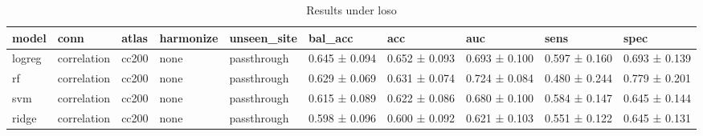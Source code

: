 \begin{table}
\caption{Results under loso}
\label{tab:loso}
\begin{tabular}{llllllllll}
\toprule
model & conn & atlas & harmonize & unseen\_site & bal\_acc & acc & auc & sens & spec \\
\midrule
logreg & correlation & cc200 & none & passthrough & 0.645 ± 0.094 & 0.652 ± 0.093 & 0.693 ± 0.100 & 0.597 ± 0.160 & 0.693 ± 0.139 \\
rf & correlation & cc200 & none & passthrough & 0.629 ± 0.069 & 0.631 ± 0.074 & 0.724 ± 0.084 & 0.480 ± 0.244 & 0.779 ± 0.201 \\
svm & correlation & cc200 & none & passthrough & 0.615 ± 0.089 & 0.622 ± 0.086 & 0.680 ± 0.100 & 0.584 ± 0.147 & 0.645 ± 0.144 \\
ridge & correlation & cc200 & none & passthrough & 0.598 ± 0.096 & 0.600 ± 0.092 & 0.621 ± 0.103 & 0.551 ± 0.122 & 0.645 ± 0.131 \\
\bottomrule
\end{tabular}
\end{table}
